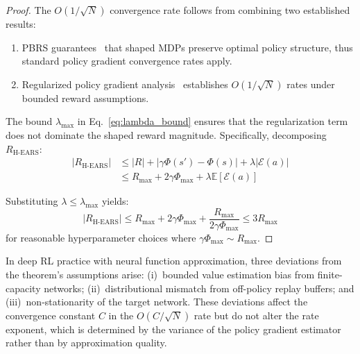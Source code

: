 \documentclass[journal]{IEEEtran}
\begin{document}
	\begin{proof}
		The $O(1/\sqrt{N})$ convergence rate follows from combining two established results:
		\begin{enumerate}
			\item PBRS guarantees~\cite{ng1999policy} that shaped MDPs preserve optimal policy structure, thus standard policy gradient convergence rates apply.
			\item Regularized policy gradient analysis~\cite{schulman2017proximal} establishes $O(1/\sqrt{N})$ rates under bounded reward assumptions.
		\end{enumerate}
		
		The bound $\lambda_{\max}$ in Eq.~\eqref{eq:lambda_bound} ensures that the regularization term does not dominate the shaped reward magnitude. Specifically, decomposing $R_{\text{H-EARS}}$:
		\begin{align}
			|R_{\text{H-EARS}}| &\leq |R| + |\gamma\Phi(s')-\Phi(s)| + \lambda|\mathcal{E}(a)| \\
			&\leq R_{\max} + 2\gamma\Phi_{\max} + \lambda\mathbb{E}[\mathcal{E}(a)]
		\end{align}
		
		Substituting $\lambda \leq \lambda_{\max}$ yields:
		\begin{equation}
			|R_{\text{H-EARS}}| \leq R_{\max} + 2\gamma\Phi_{\max} + \frac{R_{\max}}{2\gamma\Phi_{\max}} \leq 3R_{\max}
		\end{equation}
		for reasonable hyperparameter choices where $\gamma\Phi_{\max} \sim R_{\max}$.
	\end{proof}
	
	In deep RL practice with neural function approximation, three deviations from the theorem's assumptions arise: (i)~bounded value estimation bias from finite-capacity networks; (ii)~distributional mismatch from off-policy replay buffers; and (iii)~non-stationarity of the target network. These deviations affect the convergence constant $C$ in the $O(C/\sqrt{N})$ rate but do not alter the rate exponent, which is determined by the variance of the policy gradient estimator rather than by approximation quality.
	
\end{document}
